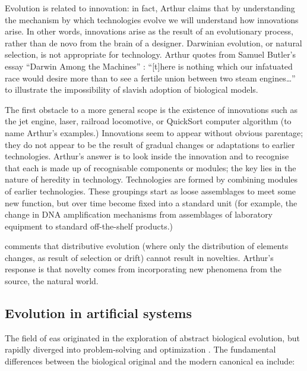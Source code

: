 Evolution is related to innovation: in fact, Arthur claims that by understanding the mechanism by which technologies evolve we will understand how innovations arise. In other words, innovations arise
as the result of an evolutionary process, rather than de novo from the brain of a designer. Darwinian evolution, or natural selection, is not appropriate for technology. Arthur quotes from Samuel Butler's essay ``Darwin Among the Machines'' : ``{[}t{]}here is nothing which our infatuated race would desire more than to see a fertile union between two steam engines\ldots{}'' to illustrate the impossibility of slavish adoption of biological models.

The first obstacle to a more general scope is the existence of innovations such as the jet engine, laser, railroad locomotive, or QuickSort computer algorithm (to name Arthur's examples.) Innovations seem to appear without obvious parentage; they do not appear to be the result of gradual changes or adaptations to earlier technologies. Arthur's answer is to look inside the innovation and to recognise that each is made up of recognisable components or modules; the key lies in the nature of heredity in technology. Technologies are formed by combining modules of earlier technologies. These groupings start as loose assemblages to meet some new function, but over time become fixed into a standard unit (for example, the change in DNA amplification mechanisms from assemblages of laboratory equipment to standard off-the-shelf products.)

\parencite{Bourrat2015} comments that distributive evolution (where only the distribution of elements changes, as result of selection or drift) cannot result in novelties. Arthur's response is that novelty comes from incorporating new phenomena from the source, the natural world.

\subsection{Evolution in artificial systems}

The field of \glspl{ea} originated in the exploration of abstract biological evolution, but rapidly diverged into problem-solving and optimization \cite{De-Jong:1993gy,DeJong2006}. The fundamental differences between the biological original and the modern canonical \gls{ea} include:

